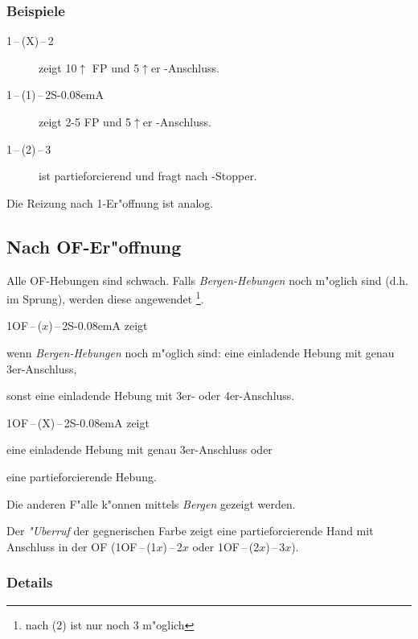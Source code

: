 \documentclass[11pt,german,twocolumn,twoside]{scrartcl}
\def\ka{\Di\xspace}
\def\tr{\Cl\xspace}
\def\sa{\nobreak\textsf{S\kern-0.08emA}\xspace}
\def\ofa{\nobreak\textsf{OF}\xspace}
\def\pik{\nobreak\hspace{\cardskip}\Sp\xspace}
\def\kar{\nobreak\hspace{\cardskip}\Di\xspace}
\def\tre{\nobreak\hspace{\cardskip}\Cl\xspace}
\def\SA{\nobreak\hspace{\cardskip}\sa}
\def\of{\nobreak\hspace{\cardskip}\textsf{OF}\xspace}
\def\pl{$\uparrow$\xspace}
\def\any{$x$\xspace}
\def\anybid{\nobreak\hspace{\cardskip}\any}
\def\kontra{\textsf{X}\xspace}
\def\sep{\,--\,}
\newcommand{\conv}[1]{\emph{#1}}
\begin{document}
\subsubsection*{Beispiele}
\begin{description}
\item[1\kar{}\sep(\kontra){}\sep2\kar] zeigt 10\pl FP und 5\pl{}er
  \ka-Anschluss.
\item[1\tre{}\sep(1\pik){}\sep2\SA] zeigt 2-5 FP und 5\pl{}er
  \tr-Anschluss.
\item[1\kar{}\sep(2\tre){}\sep3\tre] ist partieforcierend und fragt nach
  \tr-Stopper.
\end{description}

Die Reizung nach 1\kar-Er"offnung ist analog.

\subsection{Nach \of-Er"offnung}
\begin{compactitem}
\item Alle \ofa-Hebungen sind schwach.  Falls \conv{Bergen-Hebungen}
  noch m"oglich sind (d.h. im Sprung), werden diese angewendet%
  \footnote{nach (2\tre) ist nur noch 3\kar m"oglich}.
\item 1\of{}\sep($x$){}\sep2\SA zeigt
  \begin{compactitem}
  \item wenn \conv{Bergen-Hebungen} noch m"oglich sind: eine einladende
    Hebung mit genau 3er-Anschluss,
  \item sonst eine einladende Hebung mit 3er- oder 4er-Anschluss.
  \end{compactitem}
\item 1\of{}\sep(\kontra){}\sep2\SA zeigt
  \begin{compactitem}
    \item eine einladende Hebung mit genau 3er-Anschluss oder
    \item eine partieforcierende Hebung.
  \end{compactitem}
Die anderen F"alle k"onnen mittels \conv{Bergen} gezeigt werden.
\item Der \conv{"Uberruf} der gegnerischen Farbe zeigt eine
  partieforcierende Hand mit Anschluss in der \ofa
  (1\of{}\sep(1\anybid){}\sep2\anybid{} oder 1\of{}\sep(2\anybid){}\sep3\anybid{}).
\end{compactitem}

\subsubsection*{Details}
\end{document}
